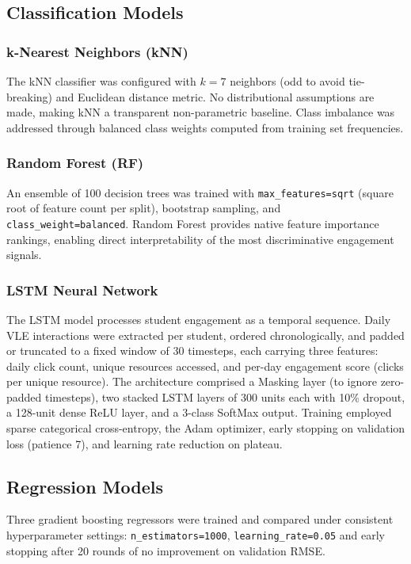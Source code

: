 \documentclass[conference]{IEEEtran}
\begin{document}
\subsection{Classification Models}

\subsubsection{k-Nearest Neighbors (kNN)}
The kNN classifier was configured with $k=7$ neighbors (odd to avoid tie-breaking) and Euclidean distance metric. No distributional assumptions are made, making kNN a transparent non-parametric baseline. Class imbalance was addressed through balanced class weights computed from training set frequencies.

\subsubsection{Random Forest (RF)}
An ensemble of 100 decision trees was trained with \texttt{max\_features=sqrt} (square root of feature count per split), bootstrap sampling, and \texttt{class\_weight=balanced}. Random Forest provides native feature importance rankings, enabling direct interpretability of the most discriminative engagement signals.

\subsubsection{LSTM Neural Network}
The LSTM model processes student engagement as a temporal sequence. Daily VLE interactions were extracted per student, ordered chronologically, and padded or truncated to a fixed window of 30 timesteps, each carrying three features: daily click count, unique resources accessed, and per-day engagement score (clicks per unique resource). The architecture comprised a Masking layer (to ignore zero-padded timesteps), two stacked LSTM layers of 300 units each with 10\% dropout, a 128-unit dense ReLU layer, and a 3-class SoftMax output. Training employed sparse categorical cross-entropy, the Adam optimizer, early stopping on validation loss (patience 7), and learning rate reduction on plateau.

\subsection{Regression Models}
Three gradient boosting regressors were trained and compared under consistent hyperparameter settings: \texttt{n\_estimators=1000}, \texttt{learning\_rate=0.05} and early stopping after 20 rounds of no improvement on validation RMSE.
\end{document}

